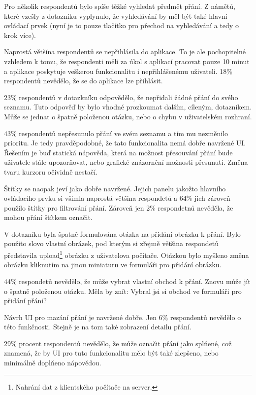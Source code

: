 Pro několik respondentů bylo spíše těžké vyhledat předmět přání. Z námětů, které vzešly z dotazníku vyplynulo, že vyhledávání by měl být také hlavní ovládací prvek (nyní je to pouze tlačítko pro přechod na vyhledávání a tedy o krok více).

Naprostá většína respondentů se nepřihlásila do aplikace. To je ale pochopitelné vzhledem k tomu, že respondenti měli za úkol s aplikací pracovat pouze 10 minut a aplikace poskytuje veškerou funkcionalitu i nepřihlášenému uživateli. 18\% respondentů nevědělo, že se do aplikace lze přihlásit.

23\% respondentů v dotazkníku odpovědělo, že nepřidali žádné přání do svého seznamu. Tuto odpověď by bylo vhodné prozkoumat dalším, cíleným, dotazníkem. Může se jednat o špatně položenou otázku, nebo o chybu v uživatelském rozhraní.

43\% respondentů nepřesunulo přání ve svém seznamu a tím mu nezměnilo prioritu. Je tedy pravděpodobné, že tato funkcionalita nemá dobře navržené UI. Řešením je buď statická nápověda, která na možnost přesouvání přání bude uživatele stále upozorňovat, nebo grafické znázornění možnosti přesunutí. Změna tvaru kurzoru očividně nestačí.

Štítky se naopak jeví jako dobře navržené. Jejich panelu jakožto hlavního ovládacího prvku si všimla naprostá většina respondetů a 64\% jich zároveň použilo štítky pro filtrování přání. Zároveň jen 2\% respondetnů nevěděla, že mohou přání štítkem označit.

V dotazníku byla špatně formulována otázka na přidání obrázku k přání. Bylo použito slovo vlastní obrázek, pod kterým si zřejmě většina respondetů představila upload\footnote{Nahrání dat z klientského počítače na server.} obrázku z uživatelova počítače. Otázkou bylo myšleno změna obrázku kliknutím na jinou miniaturu ve formuláři pro přidání obrázku.

44\% respondetů nevědělo, že může vybrat vlastní obchod k přání. Znovu může jít o špatně položenou otázku. Měla by znít: Vybral jsi si obchod ve formuláři pro přidání přání?

Návrh UI pro mazání přání je navržené dobře. Jen 6\% respondentů nevědělo o této funkčnosti. Stejně je na tom také zobrazení detailu přání.

29\% procent respondentů nevědělo, že může označit přání jako splňené, což znamená, že by UI pro tuto funkcionalitu mělo být také zlepšeno, nebo minimálně doplňeno nápovědou.








